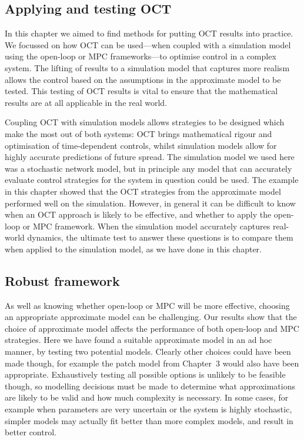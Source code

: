 \subsection{Applying and testing OCT}

In this chapter we aimed to find methods for putting OCT results into practice. We focussed on how OCT can be used---when coupled with a simulation model using the open-loop or MPC frameworks---to optimise control in a complex system. The lifting of results to a simulation model that captures more realism allows the control based on the assumptions in the approximate model to be tested. This testing of OCT results is vital to ensure that the mathematical results are at all applicable in the real world.

Coupling OCT with simulation models allows strategies to be designed which make the most out of both systems: OCT brings mathematical rigour and optimisation of time-dependent controls, whilst simulation models allow for highly accurate predictions of future spread. The simulation model we used here was a stochastic network model, but in principle any model that can accurately evaluate control strategies for the system in question could be used. The example in this chapter showed that the OCT strategies from the approximate model performed well on the simulation. However, in general it can be difficult to know when an OCT approach is likely to be effective, and whether to apply the open-loop or MPC framework. When the simulation model accurately captures real-world dynamics, the ultimate test to answer these questions is to compare them when applied to the simulation model, as we have done in this chapter.

\subsection{Robust framework}

As well as knowing whether open-loop or MPC will be more effective, choosing an appropriate approximate model can be challenging. Our results show that the choice of approximate model affects the performance of both open-loop and MPC strategies. Here we have found a suitable approximate model in an ad hoc manner, by testing two potential models. Clearly other choices could have been made though, for example the patch model from Chapter~3 would also have been appropriate. Exhaustively testing all possible options is unlikely to be feasible though, so modelling decisions must be made to determine what approximations are likely to be valid and how much complexity is necessary. In some cases, for example when parameters are very uncertain or the system is highly stochastic, simpler models may actually fit better than more complex models, and result in better control.

